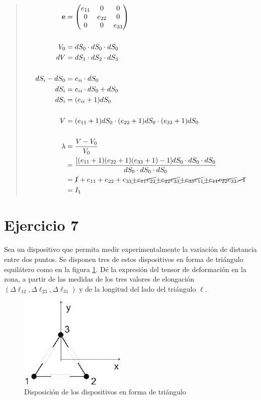 \documentclass[a4paper,10pt,twoside,final,spanish]{article}
\begin{document}
\begin{quote}

\begin{align*}
\mathbf{e} &= \begin{pmatrix}
e_{11} & 0      & 0      \\
0      & e_{22} & 0      \\
0      & 0      & e_{33}
\end{pmatrix} \\ \\
V_{0} &= dS_{0}\cdot dS_{0}\cdot dS_{0} \\
dV &= dS_{1}\cdot dS_{2}\cdot dS_{3} \\ \\
dS_{i}-dS_{0} &= e_{ii}\cdot dS_{0} \\
dS_{i} &= e_{ii}\cdot dS_{0}+dS_{0} \\
dS_{i} &= (e_{ii}+1)dS_{0} \\ \\
V &= (e_{11}+1)dS_{0}\cdot (e_{22}+1)dS_{0}\cdot (e_{33}+1)dS_{0} \\ \\
\lambda &= \frac{V-V_{0}}{V_{0}} \\
&= \frac{[(e_{11}+1)(e_{22}+1)(e_{33}+1)-1]dS_{0}\cdot dS_{0}\cdot dS_{0}}{dS_{0}\cdot dS_{0}\cdot dS_{0}} \\
&= \cancel{1}
+e_{11}+e_{22}+e_{33}
\cancel{+e_{11}e_{22}}
\cancel{+e_{22}e_{33}}
\cancel{+e_{33}e_{11}}
\cancel{+e_{11}e_{22}e_{33}}
\cancel{-1} \\
&= I_{1}
\end{align*}

\end{quote}

\section*{Ejercicio 7}

Sea un dispositivo que permita medir experimentalmente la variación de distancia entre 
dos puntos. Se disponen tres de estos dispositivos en forma de triángulo equilátero como en la figura \ref{fig:ej7}. Dé la expresión del tensor de deformación en la zona, a partir de las medidas de los tres valores de elongación $(\Delta \ell_{12},\Delta \ell_{23},\Delta \ell_{31})$ y de la longitud del lado del triángulo $\ell$.

\begin{figure}[!htbp]
\centerline{\includegraphics[scale=1.5]{ej7}}
\caption{Disposición de los dispositivos en forma de triángulo}
\label{fig:ej7}
\end{figure}
\end{document}
